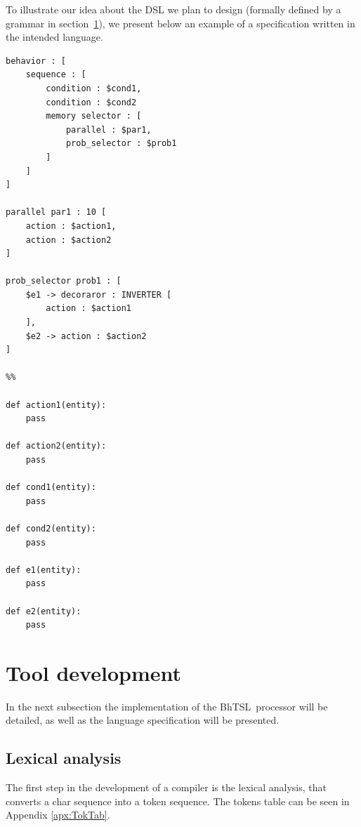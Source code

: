 \documentclass[a4paper,UKenglish,cleveref, autoref, thm-restate]{oasics-v2019}
\def\bht{BhTSL}
\begin{document}
To illustrate our idea about the DSL we plan to design (formally defined by a grammar in section~\ref{sec:tool_development}),
we present below an example of a specification written in the intended language.
\begin{lstlisting}
behavior : [
    sequence : [
        condition : $cond1,
        condition : $cond2
        memory selector : [
            parallel : $par1,
            prob_selector : $prob1
        ]
    ]
]

parallel par1 : 10 [
    action : $action1,
    action : $action2
]

prob_selector prob1 : [
    $e1 -> decoraror : INVERTER [
        action : $action1
    ],
    $e2 -> action : $action2
]

%%

def action1(entity):
    pass

def action2(entity):
    pass

def cond1(entity):
    pass

def cond2(entity):
    pass

def e1(entity):
    pass

def e2(entity):
    pass
\end{lstlisting}

\section{Tool development}
\label{sec:tool_development}
In the next subsection the implementation of the \bht\ processor will be detailed, as well as the language
specification will be presented.

\subsection{Lexical analysis}
The first step in the development of a compiler is the lexical analysis, that converts a char sequence
into a token sequence.
The tokens table can be seen in Appendix \ref{apx:TokTab}.
\end{document}
